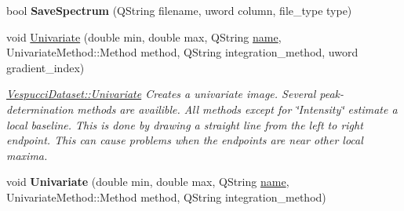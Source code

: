 \begin{DoxyCompactItemize}
\item 
\hypertarget{class_vespucci_dataset_a47cdd14a8b190bf8b8bd2c1d9a466dc5}{bool {\bfseries Save\+Spectrum} (Q\+String filename, uword column, file\+\_\+type type)}\label{class_vespucci_dataset_a47cdd14a8b190bf8b8bd2c1d9a466dc5}

\item 
void \hyperlink{class_vespucci_dataset_a385a4f192546dc9fb0c363ca7611d0a2}{Univariate} (double min, double max, Q\+String \hyperlink{class_vespucci_dataset_ae5b30cb466acfdf741b360bc4f897cc9}{name}, Univariate\+Method\+::\+Method method, Q\+String integration\+\_\+method, uword gradient\+\_\+index)
\begin{DoxyCompactList}\small\item\em \hyperlink{class_vespucci_dataset_a385a4f192546dc9fb0c363ca7611d0a2}{Vespucci\+Dataset\+::\+Univariate} Creates a univariate image. Several peak-\/determination methods are availible. All methods except for \char`\"{}\+Intensity\char`\"{} estimate a local baseline. This is done by drawing a straight line from the left to right endpoint. This can cause problems when the endpoints are near other local maxima. \end{DoxyCompactList}\item 
\hypertarget{class_vespucci_dataset_ad7691f7254731334236ecc4a58fd81f0}{void {\bfseries Univariate} (double min, double max, Q\+String \hyperlink{class_vespucci_dataset_ae5b30cb466acfdf741b360bc4f897cc9}{name}, Univariate\+Method\+::\+Method method, Q\+String integration\+\_\+method)}\label{class_vespucci_dataset_ad7691f7254731334236ecc4a58fd81f0}


\end{DoxyCompactItemize}
